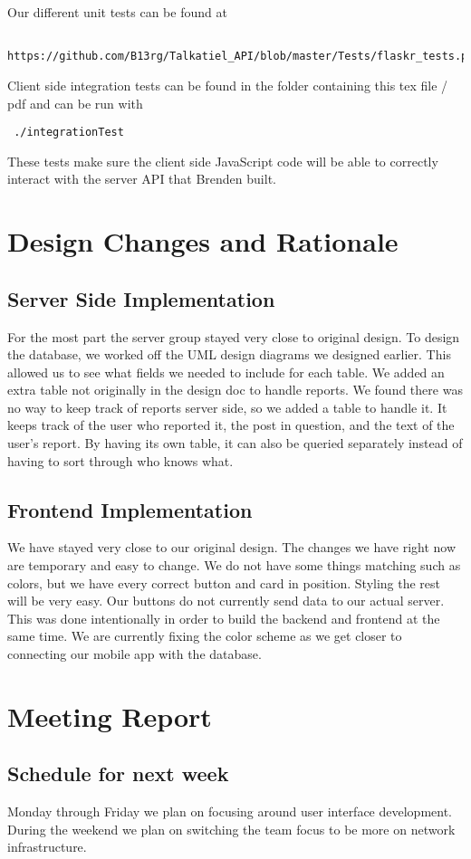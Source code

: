 \documentclass[12pt]{article}
\begin{document}
Our different unit tests can be found at \begin{verbatim} https://github.com/B13rg/Talkatiel_API/blob/master/Tests/flaskr_tests.py \end{verbatim}

Client side integration tests can be found in the folder containing this tex file / pdf and can be run with \begin{verbatim} ./integrationTest \end{verbatim}
These tests make sure the client side JavaScript code will be able to correctly interact with the server API that Brenden built. 

\section{Design Changes and Rationale}
\subsection{Server Side Implementation}
For the most part the server group stayed very close to original design.  To design the database, we worked off the UML design diagrams we designed earlier.  This allowed us to see what fields we needed to include for each table.  We added an extra table not originally in the design doc to handle reports.  We found there was no way to keep track of reports server side, so we added a table to handle it.  It keeps track of the user who reported it, the post in question, and the text of the user’s report.  By having its own table, it can also be queried separately instead of having to sort through who knows what.
\subsection{Frontend Implementation}
We have stayed very close to our original design. The changes we have right now are temporary and easy to change. We do not have some things matching such as colors, but we have every correct button and card in position. Styling the rest will be very easy. Our buttons do not currently send data to our actual server. This was done intentionally in order to build the backend and frontend at the same time. We are currently fixing the color scheme as we get closer to connecting our mobile app with the database.
\section{Meeting Report}
\subsection{Schedule for next week}
Monday through Friday we plan on focusing around user interface development. During the weekend we plan on switching the team focus to be more on network infrastructure.
\end{document}

